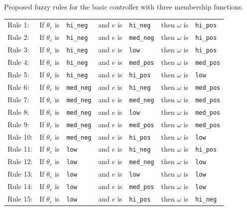 \documentclass[symmetry,article,submit,moreauthors,pdftex]{Definitions/mdpi}
\begin{document}
\begin{specialtable}[H]
    \caption{Proposed fuzzy rules for the basic controller with three membership functions.}\label{tab:5mfRules}
    \centering
    \begin{tabular}{lllllll}
    Rule 1:  & If $\theta_e$ is & { \tt hi\_neg}  & and $e$ is  & { \tt hi\_neg}  &	then $\omega$ is & { \tt hi\_pos}  \\
    Rule 2:  & If $\theta_e$ is & { \tt hi\_neg}  & and $e$ is	& { \tt med\_neg} &	then $\omega$ is & { \tt hi\_pos}  \\
    Rule 3:  & If $\theta_e$ is & { \tt hi\_neg}  & and $e$ is  & { \tt low}      &	then $\omega$ is & { \tt hi\_pos}  \\
    Rule 4:  & If $\theta_e$ is & { \tt hi\_neg}  & and $e$ is	& { \tt med\_pos} &	then $\omega$ is & { \tt med\_pos} \\
    Rule 5:  & If $\theta_e$ is & { \tt hi\_neg}  & and $e$ is	& { \tt hi\_pos}  &	then $\omega$ is & { \tt low}      \\
    Rule 6:  & If $\theta_e$ is & { \tt med\_neg} & and $e$ is	& { \tt hi\_neg}  &	then $\omega$ is & { \tt med\_pos} \\
    Rule 7:  & If $\theta_e$ is & { \tt med\_neg} & and $e$ is	& { \tt med\_neg} &	then $\omega$ is & { \tt med\_pos} \\
    Rule 8:  & If $\theta_e$ is & { \tt med\_neg} & and $e$ is	& { \tt low}      &	then $\omega$ is & { \tt med\_pos} \\
    Rule 9:  & If $\theta_e$ is & { \tt med\_neg} & and $e$ is	& { \tt med\_pos} &	then $\omega$ is & { \tt med\_pos} \\
    Rule 10: & If $\theta_e$ is	& { \tt med\_neg} & and $e$ is	& { \tt hi\_pos}  &	then $\omega$ is & { \tt low}      \\
    Rule 11: & If $\theta_e$ is	& { \tt low}      &	and $e$ is	& { \tt hi\_neg}  &	then $\omega$ is & { \tt hi\_pos}  \\
    Rule 12: & If $\theta_e$ is	& { \tt low}      &	and $e$ is	& { \tt med\_neg} &	then $\omega$ is & { \tt low}      \\
    Rule 13: & If $\theta_e$ is	& { \tt low}      &	and $e$ is	& { \tt low}      &	then $\omega$ is & { \tt low}      \\
    Rule 14: & If $\theta_e$ is	& { \tt low}      &	and $e$ is	& { \tt med\_pos} &	then $\omega$ is & { \tt low}      \\
    Rule 15: & If $\theta_e$ is	& { \tt low}      &	and $e$ is	& { \tt hi\_pos}  &	then $\omega$ is & { \tt hi\_neg}  \\

\end{tabular}
\end{specialtable}
\end{document}
